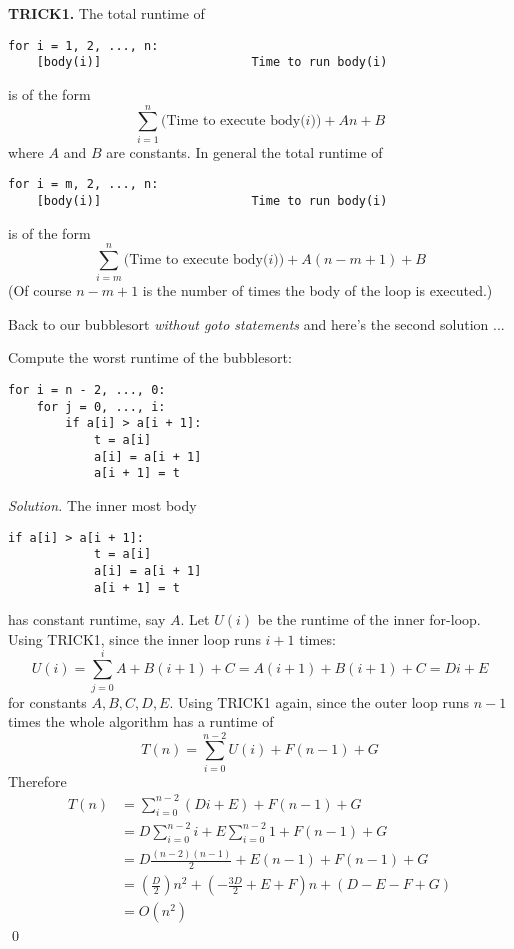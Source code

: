 \textbf{TRICK1.}
The total runtime of
\begin{Verbatim}[frame=single, fontfamily=tt, fontsize=\footnotesize]
for i = 1, 2, ..., n:             
    [body(i)]                     Time to run body(i)
\end{Verbatim}
is of the form 
\[
\sum_{i=1}^n (\text{Time to execute body($i$))} + An + B 
\]
where $A$ and $B$ are constants.
In general the total runtime of
\begin{Verbatim}[frame=single, fontfamily=tt, fontsize=\footnotesize]
for i = m, 2, ..., n:             
    [body(i)]                     Time to run body(i)
\end{Verbatim}
is of the form 
\[
\sum_{i=m}^n (\text{Time to execute body($i$))} + A(n-m+1) + B 
\]
(Of course $n-m+1$ is the number of times the body of the
loop is executed.)


Back to our bubblesort \textit{ without goto statements} and
here's the second solution ...

\newpage

\begin{eg}
Compute the worst runtime of the bubblesort:
\begin{Verbatim}[frame=single, fontsize=\footnotesize]
for i = n - 2, ..., 0:
    for j = 0, ..., i:
        if a[i] > a[i + 1]:
            t = a[i]
            a[i] = a[i + 1]
            a[i + 1] = t
\end{Verbatim}
\end{eg}

\textit{ Solution.}
The inner most body 
\begin{Verbatim}[frame=single, fontsize=\footnotesize]
        if a[i] > a[i + 1]:
            t = a[i]
            a[i] = a[i + 1]
            a[i + 1] = t
\end{Verbatim}
has constant runtime, say $A$.
Let $U(i)$ be the runtime of the inner for-loop.
Using TRICK1, since the inner loop runs $i + 1$ times:
\[
U(i) = \sum_{j=0}^i A + B(i+1) + C = A(i+1) + B(i+1) + C = Di + E
\]
for constants $A, B, C, D, E$.
Using TRICK1 again, since the outer loop runs $n - 1$ times
the whole algorithm has a runtime of
\[
T(n) = \sum_{i=0}^{n-2} U(i) + F(n-1) + G
\]
Therefore
\begin{align*}
T(n) 
&= \sum_{i=0}^{n-2} (Di + E) + F(n-1) + G \\
&= D \sum_{i=0}^{n-2} i + E \sum_{i=0}^{n-2} 1 + F(n-1) + G \\
&= D \frac{(n-2)(n-1)}{2}  + E(n-1) + F(n-1) + G \\
&= \left(\frac{D}{2}\right) n^2 
   + \left( 
       -\frac{3D}{2} + E + F \right)n + \left(D - E - F + G
     \right) \\
&=O (n^2)
\end{align*}
\qed

